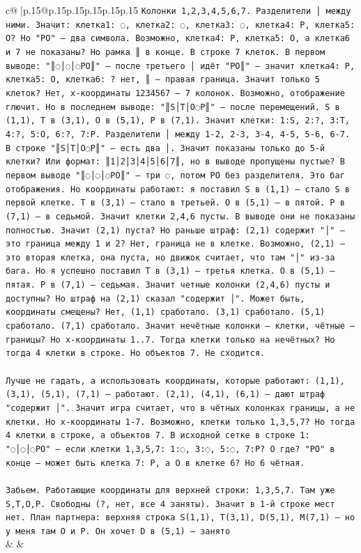 \documentclass{article}
\begin{document}
{\begin{supertabular}{c@{$\;$}|p{.15\linewidth}@{}p{.15\linewidth}p{.15\linewidth}p{.15\linewidth}p{.15\linewidth}p{.15\linewidth}}
{{{\texttt{Колонки 1,2,3,4,5,6,7. Разделители │ между ними. Значит: клетка1: ◌, клетка2: ◌, клетка3: ◌, клетка4: P, клетка5: O? Но "PO" — два символа. Возможно, клетка4: P, клетка5: O, а клетка6 и 7 не показаны? Но рамка ║ в конце. В строке 7 клеток. В первом выводе: "║◌│◌│◌PO║" — после третьего │ идёт "PO║" — значит клетка4: P, клетка5: O, клетка6: ? нет, ║ — правая граница. Значит только 5 клеток? Нет, x{-}координаты 1234567 — 7 колонок. Возможно, отображение глючит. Но в последнем выводе: "║S│T│O◌P║" — после перемещений. S в (1,1), T в (3,1), O в (5,1), P в (7,1). Значит клетки: 1:S, 2:?, 3:T, 4:?, 5:O, 6:?, 7:P. Разделители │ между 1{-}2, 2{-}3, 3{-}4, 4{-}5, 5{-}6, 6{-}7. В строке "║S│T│O◌P║" — есть два │. Значит показаны только до 5{-}й клетки? Или формат: ║1│2│3│4│5│6│7║, но в выводе пропущены пустые? В первом выводе "║◌│◌│◌PO║" — три ◌, потом PO без разделителя. Это баг отображения. Но координаты работают: я поставил S в (1,1) — стало S в первой клетке. T в (3,1) — стало в третьей. O в (5,1) — в пятой. P в (7,1) — в седьмой. Значит клетки 2,4,6 пусты. В выводе они не показаны полностью. Значит (2,1) пуста? Но раньше штраф: (2,1) содержит "│" — это граница между 1 и 2? Нет, граница не в клетке. Возможно, (2,1) — это вторая клетка, она пуста, но движок считает, что там "│" из{-}за бага. Но я успешно поставил T в (3,1) — третья клетка. O в (5,1) — пятая. P в (7,1) — седьмая. Значит четные колонки (2,4,6) пусты и доступны? Но штраф на (2,1) сказал "содержит │". Может быть, координаты смещены? Нет, (1,1) сработало. (3,1) сработало. (5,1) сработало. (7,1) сработало. Значит нечётные колонки — клетки, чётные — границы? Но x{-}координаты 1..7. Тогда клетки только на нечётных? Но тогда 4 клетки в строке. Но объектов 7. Не сходится.} \\
\\ 
\texttt{Лучше не гадать, а использовать координаты, которые работают: (1,1), (3,1), (5,1), (7,1) — работают. (2,1), (4,1), (6,1) — дают штраф "содержит │". Значит игра считает, что в чётных колонках границы, а не клетки. Но x{-}координаты 1{-}7. Возможно, клетки только 1,3,5,7? Но тогда 4 клетки в строке, а объектов 7. В исходной сетке в строке 1: "◌│◌│◌PO" — если клетки 1,3,5,7: 1:◌, 3:◌, 5:◌, 7:P? O где? "PO" в конце — может быть клетка 7: P, а O в клетке 6? Но 6 чётная.} \\
\\ 
\texttt{Забьем. Работающие координаты для верхней строки: 1,3,5,7. Там уже S,T,O,P. Свободны (?, нет, все 4 заняты). Значит в 1{-}й строке мест нет. План партнера: верхняя строка S(1,1), T(3,1), D(5,1), M(7,1) — но у меня там O и P. Он хочет D в (5,1) — занято} \\
            }
        }
    }
    & & \\ \\


\end{supertabular}}
\end{document}
